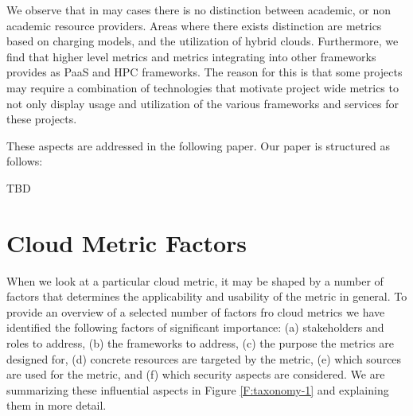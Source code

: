 \documentclass{sig-alternate-05-2015}
\begin{document}
We observe that in may cases there is no distinction between academic,
or non academic resource providers. Areas where there exists
distinction are metrics based on charging models, and the utilization
of hybrid clouds. Furthermore, we find that higher level metrics and
metrics integrating into other frameworks provides as PaaS and HPC
frameworks. The reason for this is that some projects may require a
combination of technologies that motivate project wide metrics to not
only display usage and utilization of the various frameworks and
services for these projects.


These aspects are addressed in the following paper. Our paper is
structured as follows:

TBD 

\section{Cloud Metric Factors}

When we look at a particular cloud metric, it may be shaped by a
number of factors that determines the applicability and usability of
the metric in general. To provide an overview of a selected number of
factors fro cloud metrics we have identified the following factors of
significant importance: (a) stakeholders and roles to address, (b) the
frameworks to address, (c) the purpose the metrics are designed for,
(d) concrete resources are targeted by the metric, (e) which sources
are used for the metric, and (f) which security aspects are
considered. We are summarizing these influential aspects in Figure
\ref{F:taxonomy-1} and explaining them in more detail.
\end{document}
